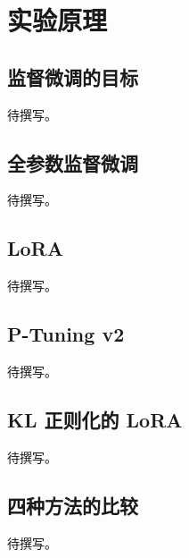 \section{实验原理}

\subsection{监督微调的目标}

待撰写。

\subsection{全参数监督微调}

待撰写。

\subsection{LoRA}

待撰写。

\subsection{P-Tuning v2}

待撰写。

\subsection{KL 正则化的 LoRA}

待撰写。

\subsection{四种方法的比较}

待撰写。
